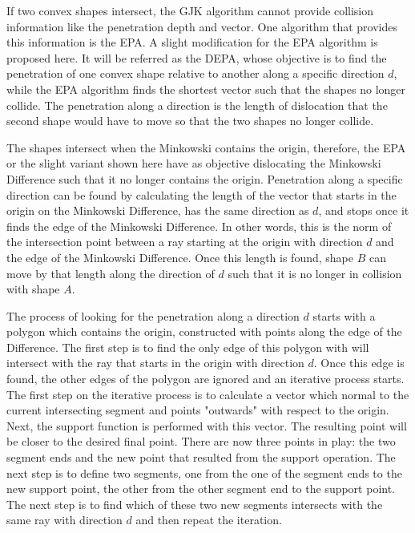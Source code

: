 \par If two convex shapes intersect, the \ac{GJK} algorithm cannot provide collision information like the penetration depth and vector. One algorithm that provides this information is the \ac{EPA}.
A slight modification for the \ac{EPA} algorithm is proposed here. It will be referred as the \ac{DEPA}, whose objective is to find the penetration of one convex shape relative to another along a specific direction $d$, while the \ac{EPA} algorithm finds the shortest vector such that the shapes no longer collide. The penetration along a direction is the length of dislocation that the second shape would have to move so that the two shapes no longer collide. 
\par The shapes intersect when the Minkowski contains the origin, therefore, the \ac{EPA} or the slight variant shown here have as objective dislocating the Minkowski Difference such that it no longer contains the origin. Penetration along a specific direction can be found by calculating the length of the vector that starts in the origin on the Minkowski Difference, has the same direction as $d$, and stops once it finds the edge of the Minkowski Difference. In other words, this is the norm of the intersection point between a ray starting at the origin with direction $d$ and the edge of the Minkowski Difference. Once this length is found, shape $B$ can move by that length along the direction of $d$ such that it is no longer in collision with shape $A$.
\par The process of looking for the penetration along a direction $d$ starts with a polygon which contains the origin, constructed with points along the edge of the Difference. The first step is to find the only edge of this polygon with will intersect with the ray that starts in the origin with direction $d$. Once this edge is found, the other edges of the polygon are ignored and an iterative process starts. The first step on the iterative process is to calculate a vector which normal to the current intersecting segment and points "outwards" with respect to the origin. Next, the support function is performed with this vector. The resulting point will be closer to the desired final point. There are now three points in play: the two segment ends and the new point that resulted from the support operation. The next step is to define two segments, one from the one of the segment ends to the new support point, the other from the other segment end to the support point. The next step is to find which of these two new segments intersects with the same ray with direction $d$ and then repeat the iteration. 



